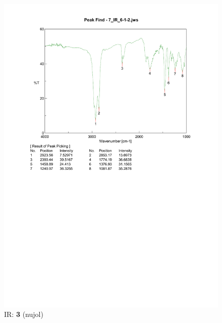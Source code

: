 \documentclass{ltjsarticle}
\theoremstyle{definition}
\numberwithin{equation}{section}
\begin{document}
\begin{figure}[htbp]
\begin{center}
\includegraphics[width = 15 cm]{IR_6-1-2.pdf}
\caption{IR: \textbf{3} (nujol)}
\label{IR_6-1-2}
\end{center}
\end{figure}
\end{document}
